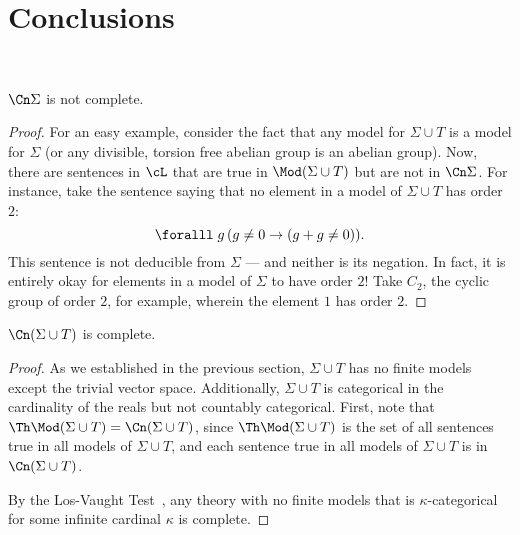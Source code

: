 \newpage
\section{Conclusions}~\label{sec:conclusions}

\begin{claim}
  $\Cn \Sigma$ is not complete.

  \begin{proof}
    For an easy example, consider the fact that any model for $\Sigma \cup T$
    is a model for $\Sigma$ (or any divisible, torsion free abelian group is an abelian group).
    Now, there are sentences in $\cL$ that are true in $\Mod (\Sigma \cup T)$
    but are not in $\Cn \Sigma$. For instance, take the sentence saying that
    no element in a model of $\Sigma \cup T$ has order $2$:
    \[ \forall g\, (g \neq 0 \lto (g + g \neq 0)). \]
    This sentence is not deducible from $\Sigma$ --- and neither
    is its negation. In fact, it is entirely okay for elements in a model of $\Sigma$
    to have order $2$! Take $C_2$, the cyclic group of order $2$,
    for example, wherein the element $1$ has order $2$.
  \end{proof}

\end{claim}

\begin{claim}
  $\Cn (\Sigma \cup T)$ is complete.

  \begin{proof}
    As we established in the previous section, $\Sigma \cup T$ has no
    finite models except the trivial vector space.
    Additionally, $\Sigma \cup T$ is categorical
    in the cardinality of the reals but not countably categorical.
    First, note that $\Th \Mod (\Sigma \cup T) = \Cn (\Sigma \cup T)$,
    since $\Th \Mod (\Sigma \cup T)$ is the set of all sentences true in all models
    of $\Sigma \cup T$, and each sentence true in all models of $\Sigma \cup T$
    is in $\Cn (\Sigma \cup T)$.

    \step
    By the Los-Vaught Test~\cite{ModelTheory},
    any theory with no finite models that is $\kappa$-categorical
    for some infinite cardinal $\kappa$ is complete.
  \end{proof}
\end{claim}


